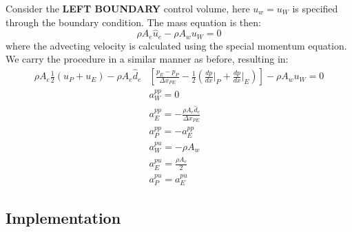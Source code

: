 \documentclass[11pt]{article}
\begin{document}
Consider the \textbf{LEFT BOUNDARY} control volume, here \(u_w = u_W\) is specified through the boundary condition. The
mass equation is then:
\begin{equation*}
\rho A_e \hat{u}_e - \rho A_w u_W = 0
\end{equation*}
where the advecting velocity is calculated using the special momentum equation. We carry the procedure in a
similar manner as before, resulting in:
\begin{equation*}
\begin{aligned}
\rho A_e \frac{1}{2}(u_P+u_E) - \rho A_e \hat{d}_e &\left[\frac{p_E-p_P}{\Delta x_{PE}}
-\frac{1}{2} \left( \frac{dp}{dx}\biggr\rvert_P + \frac{dp}{dx}\biggr\rvert_E \right) \right]
-\rho A_w u_W = 0\\
&a_W^{pp} = 0\\
&a_E^{pp} = -\frac{\rho A_e \hat{d}_e}{\Delta x_{PE}}\\
&a_P^{pp} = -a_E^{pp}\\
&a_W^{pu} = -\rho A_w\\
&a_E^{pu} = \frac{\rho A_e}{2}\\
&a_P^{pu} = a_E^{pu}
\end{aligned}
\end{equation*}
\subsection{Implementation}
\label{sec:orgd32055b}

\newpage
\end{document}
